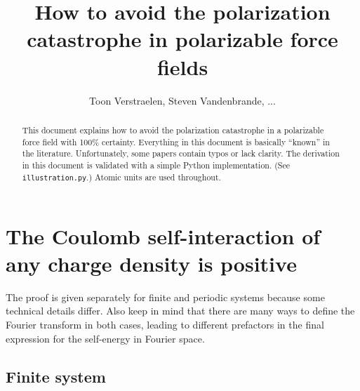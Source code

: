 \documentclass[a4paper,12pt,parskip=half]{scrartcl}
\title{How to avoid the polarization catastrophe in polarizable force fields}
\author{Toon Verstraelen, Steven Vandenbrande, ...}
\begin{document}
\maketitle

\begin{abstract}
This document explains how to avoid the polarization catastrophe in a polarizable force field with 100\% certainty. Everything in this document is basically ``known'' in the literature. Unfortunately, some papers contain typos or lack clarity. The derivation in this document is validated with a simple Python implementation. (See \texttt{illustration.py}.) Atomic units are used throughout.
\end{abstract}

\section{The Coulomb self-interaction of any charge density is positive}

The proof is given separately for finite and periodic systems because some technical details differ. Also keep in mind that there are many ways to define the Fourier transform in both cases, leading to different prefactors in the final expression for the self-energy in Fourier space.

\subsection{Finite system}
\end{document}
